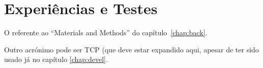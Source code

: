 \chapter{Experiências e Testes}\label{chap:tests}

O referente ao ``Materials and Methods'' do capítulo~\ref{chap:back}.

Outro acrónimo pode ser \ac{TCP} (que deve estar expandido aqui, apesar de ter sido usado já no capítulo \ref{chap:devel}.

\lipsum
